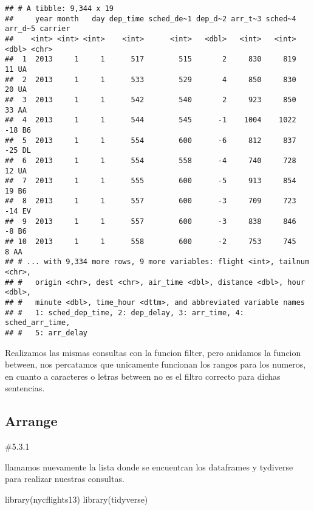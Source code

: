 \documentclass[
]{article}
\newenvironment{Shaded}{\begin{snugshade}}{\end{snugshade}}
\newcommand{\FunctionTok}[1]{\textcolor[rgb]{0.00,0.00,0.00}{#1}}
\newcommand{\NormalTok}[1]{#1}
\begin{document}
\begin{verbatim}
## # A tibble: 9,344 x 19
##     year month   day dep_time sched_de~1 dep_d~2 arr_t~3 sched~4 arr_d~5 carrier
##    <int> <int> <int>    <int>      <int>   <dbl>   <int>   <int>   <dbl> <chr>  
##  1  2013     1     1      517        515       2     830     819      11 UA     
##  2  2013     1     1      533        529       4     850     830      20 UA     
##  3  2013     1     1      542        540       2     923     850      33 AA     
##  4  2013     1     1      544        545      -1    1004    1022     -18 B6     
##  5  2013     1     1      554        600      -6     812     837     -25 DL     
##  6  2013     1     1      554        558      -4     740     728      12 UA     
##  7  2013     1     1      555        600      -5     913     854      19 B6     
##  8  2013     1     1      557        600      -3     709     723     -14 EV     
##  9  2013     1     1      557        600      -3     838     846      -8 B6     
## 10  2013     1     1      558        600      -2     753     745       8 AA     
## # ... with 9,334 more rows, 9 more variables: flight <int>, tailnum <chr>,
## #   origin <chr>, dest <chr>, air_time <dbl>, distance <dbl>, hour <dbl>,
## #   minute <dbl>, time_hour <dttm>, and abbreviated variable names
## #   1: sched_dep_time, 2: dep_delay, 3: arr_time, 4: sched_arr_time,
## #   5: arr_delay
\end{verbatim}

Realizamos las mismas consultas con la funcion filter, pero anidamos la
funcion between, nos percatamos que unicamente funcionan los rangos para
los numeros, en cuanto a caracteres o letras between no es el filtro
correcto para dichas sentencias.

\hypertarget{arrange}{%
\subsection{Arrange}\label{arrange}}

\#5.3.1

llamamos nuevamente la lista donde se encuentran los dataframes y
tydiverse para realizar nuestras consultas.

\begin{Shaded}
\begin{Highlighting}[]
\FunctionTok{library}\NormalTok{(nycflights13)}
\FunctionTok{library}\NormalTok{(tidyverse)}
\end{Highlighting}
\end{Shaded}
\end{document}
